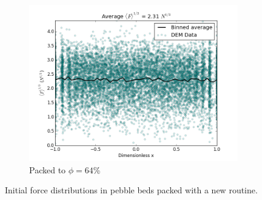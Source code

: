 \begin{figure}[!ht]
	\begin{subfigure}[b]{0.4\textwidth}
		\centering
		\includegraphics[width=\textwidth]{chapters/figures/initial_packing_study/64-deform-force-profile.png}
		\caption{Packed to $\phi = 64$\%}
	\end{subfigure}
	\caption{Initial force distributions in pebble beds packed with a new routine.}
\label{fig:contact-forces-scatter-initial}
\end{figure}

